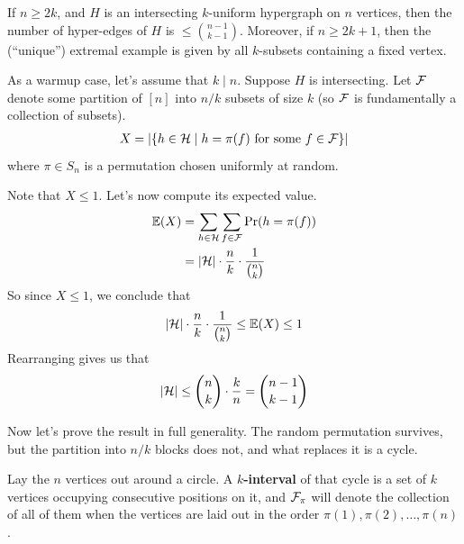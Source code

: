 \begin{boxtheorem} \label{Ch3:Thm:EKR}
    If $n \geq 2k$, and $H$ is an intersecting $k$-uniform hypergraph on $n$ vertices, then the number of hyper-edges of $H$ is $\leq \binom{n-1}{k-1}$. Moreover, if $n \geq 2k + 1$, then the (``unique'') extremal example is given by all $k$-subsets containing a fixed vertex.
\end{boxtheorem}

As a warmup case, let's assume that $k \mid n$. Suppose $H$ is intersecting. Let $\mathcal{F}$ denote some partition of $[n]$ into $n / k$ subsets of size $k$ (so $\mathcal{F}$ is fundamentally a collection of subsets).
\begin{align*}
    X = \left\lvert \left\{ h \in \mathcal{H} \; \middle\vert \; h = \pi(f) \text{ for some } f \in \mathcal{F} \right\} \right\rvert
\end{align*}
where $\pi \in S_n$ is a permutation chosen uniformly at random.

Note that $X \leq 1$. Let's now compute its expected value.
\begin{align*}
    \mathbb{E}\!\left( X \right) &= \sum_{h \in \mathcal{H}} \sum_{f \in \mathcal{F}} \Pr\!\left( h = \pi(f) \right) \\
    &= \left\lvert \mathcal{H} \right\rvert \cdot \frac{n}{k} \cdot \frac{1}{\binom{n}{k}}
\end{align*}
So since $X \leq 1$, we conclude that
\begin{align*}
    \left\lvert \mathcal{H} \right\rvert \cdot \frac{n}{k} \cdot \frac{1}{\binom{n}{k}} \leq \mathbb{E}\!\left( X \right) \leq 1
\end{align*}
Rearranging gives us that
\begin{align*}
    \left\lvert \mathcal{H} \right\rvert \leq \binom{n}{k} \cdot \frac{k}{n} = \binom{n-1}{k-1}
\end{align*}

Now let's prove the result in full generality. The random permutation survives, but the partition into $n / k$ blocks does not, and what replaces it is a cycle.

\begin{boxlnotation}
    Lay the $n$ vertices out around a circle. A \textbf{$k$-interval} of that cycle is a set of $k$ vertices occupying consecutive positions on it, and $\mathcal{F}_{\pi}$ will denote the collection of all of them when the vertices are laid out in the order $\pi(1), \pi(2), \ldots, \pi(n)$.
\end{boxlnotation}

